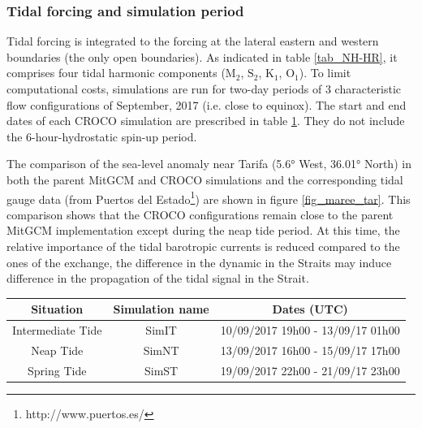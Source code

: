 \subsubsection{Tidal forcing and simulation period}
Tidal forcing is integrated to the forcing at the lateral eastern and western boundaries (the only open boundaries). As indicated in table \ref{tab_NH-HR}, it comprises four tidal harmonic components ($\text{M}_{\text{2}}$, $\text{S}_{\text{2}}$, $\text{K}_{\text{1}}$, $\text{O}_{\text{1}}$). To limit computational costs, simulations are run for two-day periods of 3 characteristic flow configurations of September, 2017 (i.e. close to equinox). The start and end dates of each CROCO simulation are prescribed in table \ref{tab_dates_MIV}. They do not include the 6-hour-hydrostatic spin-up period.

The comparison of the sea-level anomaly near Tarifa (5.6° West, 36.01° North) in both the parent MitGCM and CROCO simulations and the corresponding tidal gauge data (from Puertos del Estado\footnote{http://www.puertos.es/}) are shown in figure \ref{fig_maree_tar}. This comparison shows that the CROCO configurations remain close to the parent MitGCM implementation except during the neap tide period. At this time, the relative importance of the tidal barotropic currents is reduced compared to the ones of the exchange, the difference in the dynamic in the Straits may induce difference in the propagation of the tidal signal in the Strait.

\begin{table}[h]
        \centering
        \begin{tabular}{|c|c|c|}
                \hline
                Situation & Simulation name & Dates (UTC)\\
                \hline
                Intermediate Tide & SimIT & 10/09/2017 19h00 - 13/09/17 01h00  \\
                Neap Tide & SimNT & 13/09/2017 16h00 - 15/09/17 17h00 \\
                Spring Tide & SimST & 19/09/2017 22h00 - 21/09/17 23h00  \\
                \hline
        \end{tabular}
        \label{tab_dates_MIV}
\end{table}

